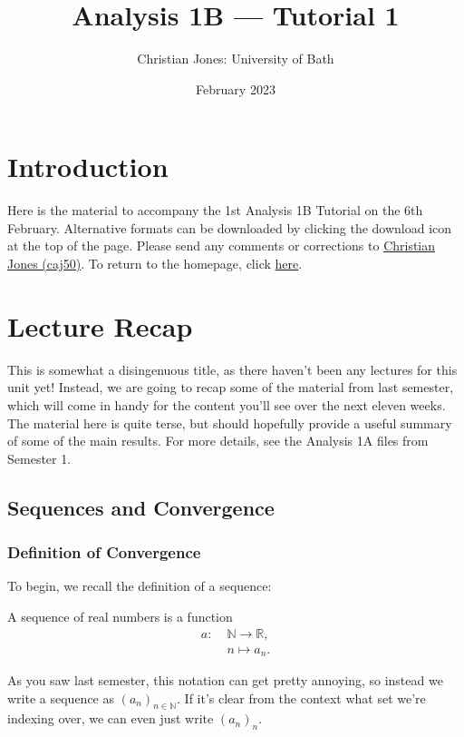 \documentclass[
  10pt,
  a4paper]{article}
\title{Analysis 1B --- Tutorial 1}
\author{Christian Jones: University of Bath}
\date{February 2023}
\theoremstyle{plain}
\theoremstyle{definition}
\theoremstyle{plain}
\theoremstyle{plain}
\theoremstyle{plain}
\theoremstyle{plain}
\theoremstyle{definition}
\theoremstyle{definition}
\theoremstyle{remark}
\theoremstyle{remark}
\let\BeginKnitrBlock\begin \let\EndKnitrBlock\end
\begin{document}
\maketitle

{
\setcounter{tocdepth}{2}
\tableofcontents
}
\newpage
{}

\hypertarget{introduction}{%
\section*{Introduction}\label{introduction}}

Here is the material to accompany the 1st Analysis 1B Tutorial on the 6th February. Alternative formats can be downloaded by clicking the download icon at the top of the page. Please send any comments or corrections to \href{mailto:caj50@bath.ac.uk}{Christian Jones (caj50)}. To return to the homepage, click \href{http://caj50.github.io/tutoring.html}{here}.

\hypertarget{lecture-recap}{%
\section{Lecture Recap}\label{lecture-recap}}

This is somewhat a disingenuous title, as there haven't been any lectures for this unit yet! Instead, we are going to recap some of the material from last semester, which will come in handy for the content you'll see over the next eleven weeks. The material here is quite terse, but should hopefully provide a useful summary of some of the main results. For more details, see the Analysis 1A files from Semester 1.

\hypertarget{sequences-and-convergence}{%
\subsection{Sequences and Convergence}\label{sequences-and-convergence}}

\hypertarget{definition-of-convergence}{%
\subsubsection{Definition of Convergence}\label{definition-of-convergence}}

To begin, we recall the definition of a sequence:
\BeginKnitrBlock{definition}[Sequence]
{\label{def:def1} }A sequence of real numbers is a function
\begin{align*}
    a:\; &\mathbb{N} \longrightarrow \mathbb{R},\\
    &n \longmapsto a_n.
\end{align*}
\EndKnitrBlock{definition}
As you saw last semester, this notation can get pretty annoying, so instead we write a sequence as \((a_n)_{n\in\mathbb{N}}\). If it's clear from the context what set we're indexing over, we can even just write \((a_n)_n\).
\end{document}
